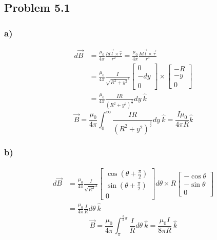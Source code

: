 \documentclass[../homework.tex]{subfiles}
\begin{document}
\subsection{Problem 5.1}
\subsubsection*{a)}
\begin{align*}
    d\vec{B} &= \frac{\mu_0}{4\pi} \frac{I d\vec{l} \times \hat{r}}{r^2} = \frac{\mu_0}{4\pi}\frac{I d\vec{l} \times \vec{r}}{r^3} \\
    &= \frac{\mu_0}{4\pi}\frac{I}{\sqrt{R^2 + y^2}^3}
    \begin{bmatrix}
        0 \\
        -dy  \\
        0
    \end{bmatrix} \times
    \begin{bmatrix}
        -R \\
        -y  \\
        0
    \end{bmatrix} \\
    &= \frac{\mu_0}{4\pi}\frac{IR}{(R^2 + y^2)^\frac{3}{2}} dy~\hat{k}
\end{align*}
\begin{equation*}
    \vec{B} = \frac{\mu_0}{4\pi}\int_{0}^{\infty} \frac{IR}{(R^2 + y^2)^\frac{3}{2}} dy~\hat{k} = \frac{I\mu_0}{4\pi R}\hat{k}
\end{equation*}

\subsubsection*{b)}
\begin{align*}
    d\vec{B} &= \frac{\mu_0}{4\pi}\frac{I}{\sqrt{R^2}^3}
    \begin{bmatrix}
        \cos(\theta + \frac{\pi}{2}) \\
        \sin(\theta + \frac{\pi}{2})  \\
        0
    \end{bmatrix} d\theta \times R
    \begin{bmatrix}
        -\cos \theta \\
        -\sin \theta  \\
        0
    \end{bmatrix} \\
    &= \frac{\mu_0}{4\pi}\frac{I}{R} d\theta~\hat{k}
\end{align*}
\begin{equation*}
    \vec{B} = \frac{\mu_0}{4\pi}\int_{\pi}^{\frac{3}{2}\pi} \frac{I}{R} d\theta~\hat{k} = \frac{\mu_0I}{8\pi R}~\hat{k}
\end{equation*}
\end{document}
